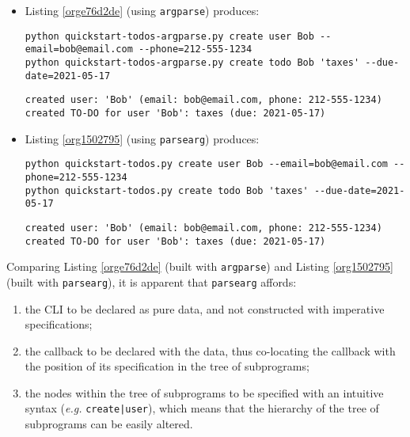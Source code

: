 \documentclass[10pt]{amsart}
\numberwithin{equation}{section}
\begin{document}
\begin{itemize}
\item Listing \ref{orge76d2de} (using \texttt{argparse}) produces:

\begin{verbatim}
python quickstart-todos-argparse.py create user Bob --email=bob@email.com --phone=212-555-1234
python quickstart-todos-argparse.py create todo Bob 'taxes' --due-date=2021-05-17
\end{verbatim}

\begin{verbatim}
created user: 'Bob' (email: bob@email.com, phone: 212-555-1234)
created TO-DO for user 'Bob': taxes (due: 2021-05-17)
\end{verbatim}

\item Listing \ref{org1502795} (using \texttt{parsearg}) produces:

\begin{verbatim}
python quickstart-todos.py create user Bob --email=bob@email.com --phone=212-555-1234
python quickstart-todos.py create todo Bob 'taxes' --due-date=2021-05-17
\end{verbatim}

\begin{verbatim}
created user: 'Bob' (email: bob@email.com, phone: 212-555-1234)
created TO-DO for user 'Bob': taxes (due: 2021-05-17)
\end{verbatim}
\end{itemize}

Comparing Listing \ref{orge76d2de} (built with \texttt{argparse}) 
and Listing \ref{org1502795} (built with \texttt{parsearg}), it is
apparent that \texttt{parsearg} affords:

\begin{enumerate}
\item the CLI to be declared as pure data, and not constructed with imperative specifications;
\item the callback to be declared with the data, thus co-locating the callback with
the position of its specification in the tree of subprograms;
\item the nodes within the tree of subprograms to be specified with an intuitive
syntax (\emph{e.g.} \texttt{create|user}), which means that the hierarchy of the
tree of subprograms can be easily altered.
\end{enumerate}
\end{document}
